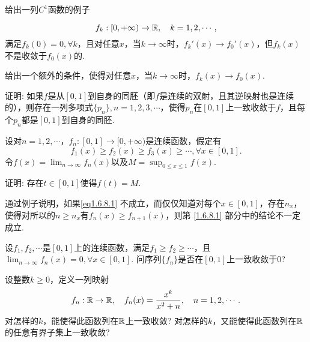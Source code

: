 \begin{example}
  \begin{enuma}
    \item 给出一列$C^1$函数的例子
  \end{enuma}
      \[ f_k:[0,+\infty)\to\mathbb R,\quad k=1,2,\cdots, \]
      满足$f_k(0)=0,\forall k$，且对任意$x$，当$k\to\infty$时，$f_k'(x)\to f_0'(x)$，但$f_k(x)$不是收敛于$f_0(x)$的.
  \begin{eenum}\setcounter{enumi}{1}
    \item 给出一个额外的条件，使得对任意$x$，当$k\to\infty$时，$f_k(x)\to f_0(x)$.
  \end{eenum}
\end{example}

\begin{example}
  证明: 如果$f$是从$[0,1]$到自身的同胚（即$f$是连续的双射，且其逆映射也是连续的），则存在一列多项式$\{p_n\},n=1,2,3,\cdots$，使得$p_n$在$[0,1]$上一致收敛于$f$，且每个$p_n$都是$[0,1]$到自身的同胚.
\end{example}

\begin{example}
  设对$n=1,2,\cdots$，$f_n:[0,1]\to[0,+\infty)$是连续函数，假定有
  \begin{equation}\label{eq1.6.8.1}
    f_1(x)\ge f_2(x)\ge f_3(x)\ge\cdots,\forall x\in[0,1].
    \tag{$\ast$}
  \end{equation}
  令$f(x)=\lim_{n\to\infty}f_n(x)$以及$M=\sup_{0\le x\le1}f(x)$.
  \begin{eenum}
    \item 证明: 存在$t\in[0,1]$使得$f(t)=M$.
    \item 通过例子说明，如果\eqref{eq1.6.8.1} 不成立，而仅仅知道对每个$x\in[0,1]$，存在$n_x$，使得对所以的$n\ge n_x$有$f_n(x)\ge f_{n+1}(x)$，则第 \ref{1.6.8.1} 部分中的结论不一定成立.
  \end{eenum}
\end{example}

\begin{example}
  设$f_1,f_2,\cdots$是$[0,1]$上的连续函数，满足$f_1\ge f_2\ge\cdots$，且$\lim_{n\to\infty}f_n(x)=0,\forall x\in[0,1]$. 问序列$\{f_n\}$是否在$[0,1]$上一致收敛于0?
\end{example}

\begin{example}
  设整数$k\ge0$，定义一列映射
  \[ f_n:\mathbb R\to\mathbb R,\quad f_n(x)=\frac{x^k}{x^2+n},\quad
  n=1,2,\cdots. \]
  对怎样的$k$，能使得此函数列在$\mathbb R$上一致收敛? 对怎样的$k$，又能使得此函数列在$\mathbb R$的任意有界子集上一致收敛?
\end{example}

